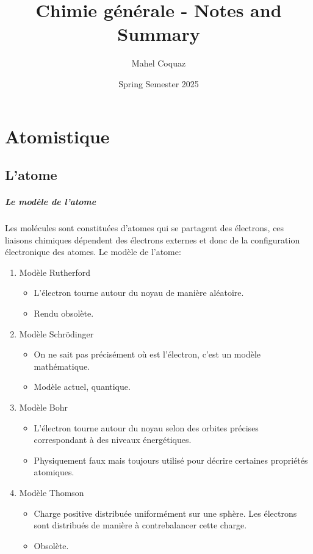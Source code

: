\documentclass[10pt,a4paper]{book}
\title{Chimie générale \vspace{0.2cm} - Notes and Summary}
\author{Mahel Coquaz}
\date{Spring Semester 2025}
\begin{document}
\maketitle
\tableofcontents
\newpage
\chapter{Atomistique}
\section{L'atome}
\paragraph{Le modèle de l'atome}
Les molécules sont constituées d'atomes qui se partagent des électrons, ces liaisons chimiques dépendent des électrons externes et donc de la configuration électronique des atomes.
Le modèle de l'atome:
\begin{enumerate}
\item Modèle Rutherford
\begin{itemize}
\item L'électron tourne autour du noyau de manière aléatoire.
\item Rendu obsolète.
\end{itemize}
\item Modèle Schrödinger
\begin{itemize}
\item On ne sait pas précisément où est l’électron, c'est un modèle mathématique.
\item Modèle actuel, quantique.
\end{itemize}
\item Modèle Bohr
\begin{itemize}
\item L'électron tourne autour du noyau selon des orbites précises correspondant à des niveaux énergétiques.
\item Physiquement faux mais toujours utilisé pour décrire certaines propriétés atomiques.
\end{itemize}
\item Modèle Thomson
\begin{itemize}
\item Charge positive distribuée uniformément sur une sphère. Les électrons sont distribués de manière à contrebalancer cette charge.
\item Obsolète.
\end{itemize}
\end{enumerate}
\newpage
\end{document}
